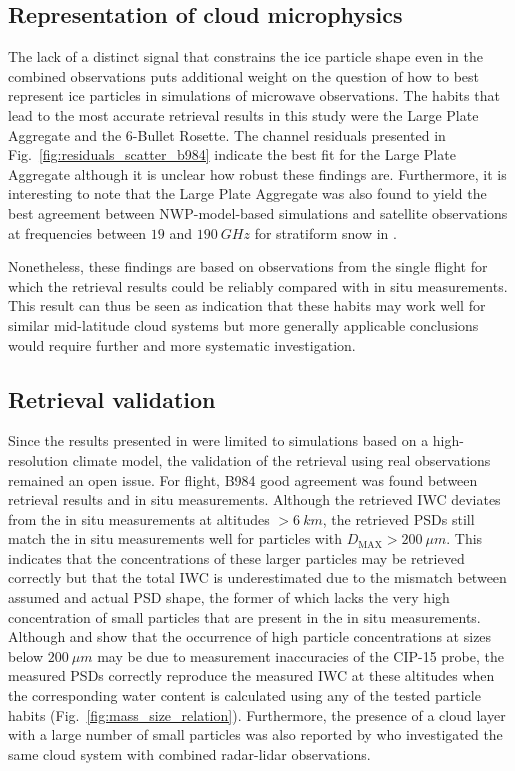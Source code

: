 \documentclass[journal abbreviation, manuscript]{copernicus}
\begin{document}
\subsection{Representation of cloud microphysics}

The lack of a distinct signal that constrains the ice particle shape even in the
combined observations puts additional weight on the question of how to best
represent ice particles in simulations of microwave observations. The habits
that lead to the most accurate retrieval results in this study were the Large
Plate Aggregate and the 6-Bullet Rosette. The channel residuals presented in
Fig.~\ref{fig:residuals_scatter_b984} indicate the best fit for the Large Plate
Aggregate although it is unclear how robust these findings are. Furthermore, it
is interesting to note that the Large Plate Aggregate was also found to yield
the best agreement between NWP-model-based simulations and satellite
observations at frequencies between $19$ and $190\ \unit{GHz}$ for stratiform
snow in \citet{geer21}.

Nonetheless, these findings are based on observations from the single flight for
which the retrieval results could be reliably compared with in situ
measurements. This result can thus be seen as indication that these habits may
work well for similar mid-latitude cloud systems but more generally applicable
conclusions would require further and more systematic investigation.

\subsection{Retrieval validation}

Since the results presented in \citet{pfreundschuh20} were limited to
simulations based on a high-resolution climate model, the validation of the
retrieval using real observations remained an open issue. For flight, B984 good
agreement was found between retrieval results and in situ measurements. Although
the retrieved IWC deviates from the in situ measurements at altitudes $>
6\ \unit{km}$, the retrieved PSDs still match the in situ measurements well for
particles with $D_\text{MAX} > 200\ \unit{\mu m}$. This indicates that the
concentrations of these larger particles may be retrieved correctly but that the
total IWC is underestimated due to the mismatch between assumed and actual PSD
shape, the former of which lacks the very high concentration of small particles
that are present in the in situ measurements. Although \citet{oshea21} and
\citet{oshea19} show that the occurrence of high particle concentrations at
sizes below $200\ \unit{\mu m}$ may be due to measurement inaccuracies of the
CIP-15 probe, the measured PSDs correctly reproduce the measured IWC at these
altitudes when the corresponding water content is calculated using any of the
tested particle habits (Fig.~\ref{fig:mass_size_relation}). Furthermore, the
presence of a cloud layer with a large number of small particles was also
reported by \citet{ewald21} who investigated the same cloud system with combined
radar-lidar observations.
\end{document}
